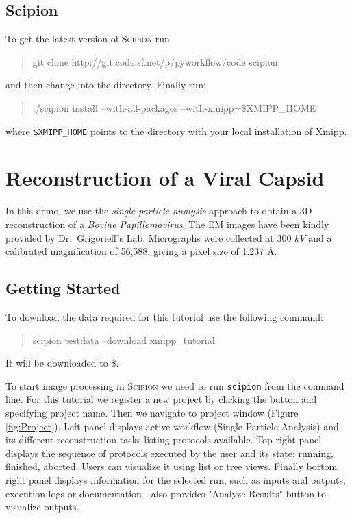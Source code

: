 \documentclass[12pt]{article} %
\newcommand{\scipion}{\textsc{Scipion} }
\newenvironment{command}{\tt\begin{quote}}{\end{quote}}
\newcommand{\comm}[1]{\texttt{#1}}
\begin{document}
\subsection{Scipion}

To get the latest version of \scipion run

\begin{command}
git clone http://git.code.sf.net/p/pyworkflow/code scipion
\end{command}

\noindent
and then change into the  directory. Finally run:

\begin{command}
./scipion install --with-all-packages --with-xmipp=\$XMIPP\_HOME
\end{command}

\noindent
where \verb+$XMIPP_HOME+ points to the directory with your local
installation of Xmipp.


\section{Reconstruction of a Viral Capsid}

In this demo, we use the \emph{single particle analysis} approach to obtain
a 3D reconstruction of a \emph{Bovine Papillomavirus}. The EM images have been kindly
provided by \href{http://grigoriefflab.janelia.org/}{Dr.~Grigorieff’s Lab}. Micrographs were
collected at 300 $kV$ and a calibrated magnification of 56,588,
giving a pixel
size of 1.237 \AA  \citep{Wolf2010}. 

\subsection{Getting Started}

To download the data required for this tutorial use the following command:

\begin{command}
scipion testdata --download xmipp\_tutorial
\end{command}

\noindent
It will be downloaded to \$. 

To start image processing in \scipion we need to run \comm{scipion} from the command line.
For this tutorial we register a new project by clicking the 
button and specifying project name. Then we navigate to project window (Figure \ref{fig:Project}).  
Left panel displays active workflow (Single Particle Analysis) 
and its different reconstruction tasks listing protocols available.
Top right panel displays the sequence of protocols executed by the user and its state: running, finished, aborted. Users can visualize it using list or tree views.
Finally bottom right panel displays information for the selected run, such as inputs and outputs, execution logs or documentation - also provides "Analyze Results" button to visualize outputs.
\end{document}
